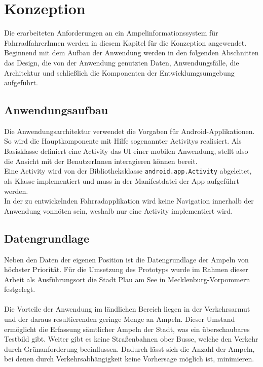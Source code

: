 \chapter{\label{chap:entwurf}Konzeption}
Die erarbeiteten Anforderungen an ein Ampelinformationssystem für FahrradfahrerInnen werden in diesem Kapitel für die Konzeption angewendet. Beginnend mit dem Aufbau der Anwendung werden in den folgenden Abschnitten das Design, die von der Anwendung genutzten Daten, Anwendungsfälle, die Architektur und schließlich die Komponenten der Entwicklumgsumgebung aufgeführt. 
\section{Anwendungsaufbau}
Die Anwendungsarchitektur verwendet die Vorgaben für Android-Applikationen. So wird die Hauptkomponente mit Hilfe sogenannter \glspl{Activity} realisiert. Als Basisklasse definiert eine \gls{Activity} das \gls{UI} einer mobilen Anwendung, stellt also die Ansicht mit der BenutzerInnen interagieren können bereit.\\
Eine \gls{Activity} wird von der Bibliotheksklasse \texttt{android.app.Activity} abgeleitet, als Klasse implementiert und muss in der Manifestdatei der \gls{App} aufgeführt werden. \cite{android_activity} \\
In der zu entwickelnden Fahrradapplikation wird keine Navigation innerhalb der Anwendung vonnöten sein, weshalb nur eine \gls{Activity} implementiert wird.
%
%
\section{Datengrundlage}
Neben den Daten der eigenen Position ist die Datengrundlage der Ampeln von höchster Priorität. Für die Umsetzung des Prototyps wurde im Rahmen dieser Arbeit als Ausführungsort die Stadt Plau am See in Mecklenburg-Vorpommern festgelegt.\\\\ 
Die Vorteile der Anwendung im ländlichen Bereich liegen in der Verkehrsarmut und der daraus resultierenden geringe Menge an Ampeln. Dieser Umstand ermöglicht die Erfassung sämtlicher Ampeln der Stadt, was ein überschaubares Testbild gibt. 
Weiter gibt es keine Straßenbahnen ober Busse, welche den Verkehr durch Grünanforderung beeinflussen. Dadurch lässt sich die Anzahl der Ampeln, bei denen durch Verkehrsabhängigkeit keine Vorhersage möglich ist, minimieren. 
%
%
\clearpage
